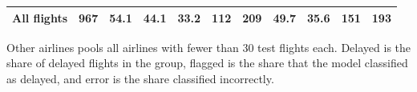\begin{table}[ht]
\begin{threeparttable}
\begin{tabular*}{\textwidth}{@{\extracolsep{\fill}}lrrrrrrrrrr@{}}
      \midrule
      All flights & 967 & 54.1 & 44.1 & 33.2 & 112 & 209 & 49.7 & 35.6 & 151 & 193 \\
      \bottomrule
    \end{tabular*}
    \begin{tablenotes}
      \footnotesize
      \item Other airlines pools all airlines with fewer than 30 test flights each. Delayed is the share of delayed flights in the group, flagged is the share that the model classified as delayed, and error is the share classified incorrectly.
    \end{tablenotes}
  \end{threeparttable}
\end{table}
